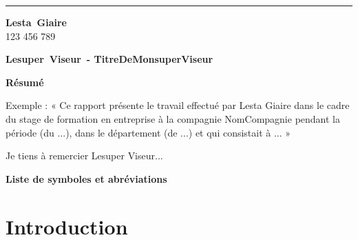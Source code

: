 \documentclass[12pt]{article} 	%
\newcommand\nomCompagnie{NomCompagnie}
\newcommand\prenomStagiaire{Lesta}
\newcommand\nomStagiaire{Giaire}
\newcommand\idul{123 456 789}
\newcommand\prenomSuperviseur{Lesuper}
\newcommand\nomSuperviseur{Viseur}
\newcommand\titreSuperviseur{TitreDeMonsuperViseur}
\begin{document}
\par\noindent\rule{\textwidth}{0.4pt}
\begin{minipage}[t]{6cm}
    \begin{flushleft}
        \textbf {\prenomStagiaire~\nomStagiaire}\\
        \idul
    \end{flushleft}
\end{minipage}
\begin{minipage}[t]{10cm}
    \begin{flushright}
        \hspace*{1cm}\textbf {\prenomSuperviseur~\nomSuperviseur~- \titreSuperviseur} \\
    \end{flushright}
\end{minipage}

\newpage
{}
\textbf{Résumé}

Exemple : « Ce rapport présente le travail effectué par {\prenomStagiaire}
    {\nomStagiaire} dans le cadre du stage de formation en entreprise à la
compagnie {\nomCompagnie} pendant la période (du ...), dans le département
(de ...) et qui consistait à ... »


\newpage
\vspace*{\fill}
\begin{center}
    Je tiens à remercier {\prenomSuperviseur} {\nomSuperviseur}...
\end{center}
\vspace*{\fill}


\newpage
\tableofcontents


\newpage
\listoftables


\newpage
\listoffigures


\newpage
\textbf{Liste de symboles et abréviations}\\
\break


\newpage
{}

\section{Introduction}
\end{document}
